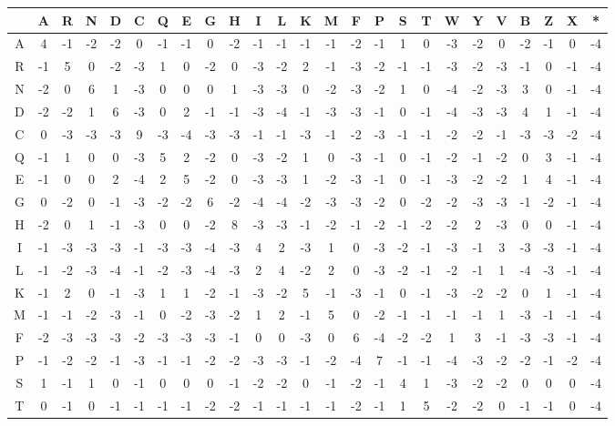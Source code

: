 \documentclass[twoside,a4paper,bsc]{master}
\begin{document}
\newpage
\small


\normalsize

\appendix
\noappendicestocpagenum
\addappheadtotoc
{}

\begin{table}
\begin{tabular}{c|cccccccccccccccccccccccc}
& A & R & N & D & C & Q & E & G & H & I & L & K & M & F & P & S & T & W & Y & V & B & Z & X & * \\
\hline
A & 4 & -1 & -2 & -2 & 0 & -1 & -1 & 0 & -2 & -1 & -1 & -1 & -1 & -2 & -1 & 1 & 0 & -3 & -2 & 0 & -2 & -1 & 0 & -4 \\
R & -1&5& 0& -2&-3&1& 0& -2&0& -3&-2&2&-1&-3&-2&-1&-1&-3&-2&-3&-1&0& -1&-4 \\
N & -2&0& 6& 1&-3&0& 0& 0& 1&-3&-3&0&-2&-3&-2&1&0& -4&-2&-3&3&0& -1&-4 \\
D & -2&-2&1& 6&-3&0& 2& -1&-1&-3&-4&-1&-3&-3&-1&0&-1&-4&-3&-3&4& 1& -1&-4 \\
C & 0& -3&-3&-3&9& -3&-4&-3&-3&-1&-1&-3&-1&-2&-3&-1&-1&-2&-2&-1&-3&-3&-2&-4 \\
Q & -1&1& 0& 0&-3&5& 2& -2&0&-3&-2&1&0& -3&-1&0&-1&-2&-1&-2&0&3& -1&-4 \\
E & -1&0& 0& 2&-4&2& 5& -2&0&-3&-3&1&-2&-3&-1&0&-1&-3&-2&-2&1&4& -1&-4 \\
G & 0& -2&0& -1&-3&-2&-2&6& -2&-4&-4&-2&-3&-3&-2&0& -2&-2&-3&-3&-1&-2&-1&-4 \\
H & -2&0& 1& -1&-3&0& 0&-2&8&-3&-3&-1&-2&-1&-2&-1&-2&-2&2&-3&0&0& -1&-4 \\
I & -1&-3&-3&-3&-1&-3&-3&-4&-3&4& 2& -3&1& 0& -3&-2&-1&-3&-1&3& -3&-3&-1&-4 \\
L & -1&-2&-3&-4&-1&-2&-3&-4&-3&2& 4& -2&2& 0& -3&-2&-1&-2&-1&1& -4&-3&-1&-4\\
K & -1&2& 0& -1&-3&1& 1& -2&-1&-3&-2&5&-1&-3&-1&0& -1&-3&-2&-2&0& 1& -1&-4\\
M & -1&-1&-2&-3&-1&0& -2&-3&-2&1& 2& -1&5& 0& -2&-1&-1&-1&-1&1& -3&-1&-1&-4 \\
F & -2&-3&-3&-3&-2&-3&-3&-3&-1&0& 0& -3&0& 6& -4&-2&-2&1& 3& -1&-3&-3&-1&-4 \\
P & -1&-2&-2&-1&-3&-1&-1&-2&-2&-3&-3&-1&-2&-4&7& -1&-1&-4&-3&-2&-2&-1&-2&-4 \\
S & 1& -1&1& 0&-1&0& 0& 0& -1&-2&-2&0&-1&-2&-1&4&1& -3&-2&-2&0& 0& 0& -4 \\
T & 0& -1&0& -1&-1&-1&-1&-2&-2&-1&-1&-1&-1&-2&-1&1& 5& -2&-2&0& -1&-1&0& -4\\

\end{tabular}
\end{table}
\end{document}

